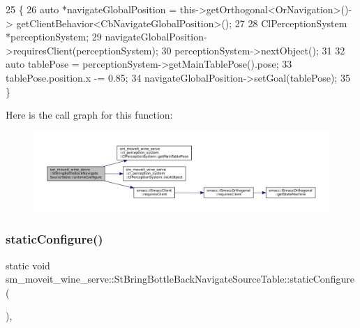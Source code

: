 \begin{DoxyCode}
25         \{
26             \textcolor{keyword}{auto} *navigateGlobalPosition = this->getOrthogonal<OrNavigation>()->
      getClientBehavior<CbNavigateGlobalPosition>();
27 
28             ClPerceptionSystem *perceptionSystem;
29             navigateGlobalPosition->requiresClient(perceptionSystem);
30             perceptionSystem->nextObject();
31 
32             \textcolor{keyword}{auto} tablePose = perceptionSystem->getMainTablePose().pose;
33             tablePose.position.x -= 0.85;
34             navigateGlobalPosition->setGoal(tablePose);
35         \}
\end{DoxyCode}
Here is the call graph for this function\+:
\nopagebreak
\begin{figure}[H]
\begin{center}
\leavevmode
\includegraphics[width=350pt]{structsm__moveit__wine__serve_1_1StBringBottleBackNavigateSourceTable_a0cbda5ab701077cacaf4ff8b167287ff_cgraph}
\end{center}
\end{figure}
\mbox{\label{structsm__moveit__wine__serve_1_1StBringBottleBackNavigateSourceTable_ad90b6fd56ed35572d731f537e5e64cdb}} 
\subsubsection{\texorpdfstring{static\+Configure()}{staticConfigure()}}
{\footnotesize\ttfamily static void sm\+\_\+moveit\+\_\+wine\+\_\+serve\+::\+St\+Bring\+Bottle\+Back\+Navigate\+Source\+Table\+::static\+Configure (\begin{DoxyParamCaption}{ }\end{DoxyParamCaption})\hspace{0.3cm}{\ttfamily [inline]}, {\ttfamily [static]}}



